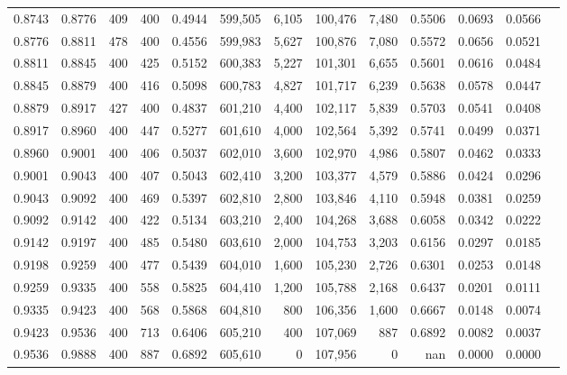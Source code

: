 \begin{tabular}{rrrrrrrrrrrrr}
0.8743 & 0.8776 &    409 & 400 &                                     0.4944 & 599,505 &   6,105 & 100,476 &   7,480 & 0.5506 & 0.0693 & 0.0566 \\
0.8776 & 0.8811 &    478 & 400 &                                     0.4556 & 599,983 &   5,627 & 100,876 &   7,080 & 0.5572 & 0.0656 & 0.0521 \\
0.8811 & 0.8845 &    400 & 425 &                                     0.5152 & 600,383 &   5,227 & 101,301 &   6,655 & 0.5601 & 0.0616 & 0.0484 \\
0.8845 & 0.8879 &    400 & 416 &                                     0.5098 & 600,783 &   4,827 & 101,717 &   6,239 & 0.5638 & 0.0578 & 0.0447 \\
0.8879 & 0.8917 &    427 & 400 &                                     0.4837 & 601,210 &   4,400 & 102,117 &   5,839 & 0.5703 & 0.0541 & 0.0408 \\
0.8917 & 0.8960 &    400 & 447 &                                     0.5277 & 601,610 &   4,000 & 102,564 &   5,392 & 0.5741 & 0.0499 & 0.0371 \\
0.8960 & 0.9001 &    400 & 406 &                                     0.5037 & 602,010 &   3,600 & 102,970 &   4,986 & 0.5807 & 0.0462 & 0.0333 \\
0.9001 & 0.9043 &    400 & 407 &                                     0.5043 & 602,410 &   3,200 & 103,377 &   4,579 & 0.5886 & 0.0424 & 0.0296 \\
0.9043 & 0.9092 &    400 & 469 &                                     0.5397 & 602,810 &   2,800 & 103,846 &   4,110 & 0.5948 & 0.0381 & 0.0259 \\
0.9092 & 0.9142 &    400 & 422 &                                     0.5134 & 603,210 &   2,400 & 104,268 &   3,688 & 0.6058 & 0.0342 & 0.0222 \\
0.9142 & 0.9197 &    400 & 485 &                                     0.5480 & 603,610 &   2,000 & 104,753 &   3,203 & 0.6156 & 0.0297 & 0.0185 \\
0.9198 & 0.9259 &    400 & 477 &                                     0.5439 & 604,010 &   1,600 & 105,230 &   2,726 & 0.6301 & 0.0253 & 0.0148 \\
0.9259 & 0.9335 &    400 & 558 &                                     0.5825 & 604,410 &   1,200 & 105,788 &   2,168 & 0.6437 & 0.0201 & 0.0111 \\
0.9335 & 0.9423 &    400 & 568 &                                     0.5868 & 604,810 &     800 & 106,356 &   1,600 & 0.6667 & 0.0148 & 0.0074 \\
0.9423 & 0.9536 &    400 & 713 &                                     0.6406 & 605,210 &     400 & 107,069 &     887 & 0.6892 & 0.0082 & 0.0037 \\
0.9536 & 0.9888 &    400 & 887 &                                     0.6892 & 605,610 &       0 & 107,956 &       0 &    nan & 0.0000 & 0.0000 \\
\bottomrule
\end{tabular}
